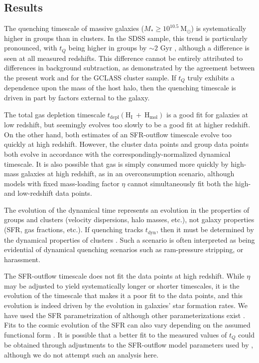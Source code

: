 \subsection{Results}

The quenching timescale of massive galaxies ($M_* \geq 10^{10.5}~ \mathrm{M}_\odot$) is systematically higher in groups than in clusters.
In the SDSS sample, this trend is particularly pronounced, with $t_Q$ being higher in groups by $\sim2$ Gyr \citep{Balogh:2016aa}, although a difference is seen at all measured redshifts.
This difference cannot be entirely attributed to differences in background subtraction, as demonstrated by the agreement between the present work and \citet{Balogh:2016aa} for the GCLASS cluster sample.
If $t_Q$ truly exhibits a dependence upon the mass of the host halo, then the quenching timescale is driven in part by factors external to the galaxy.

The total gas depletion timescale $t_{\mathrm{depl}}(\mathrm{H_I}~+~\mathrm{H_{mol}})$ is a good fit for galaxies at low redshift, but seemingly evolves too slowly to be a good fit at higher redshift.
On the other hand, both estimates of an SFR-outflow timescale evolve too quickly at high redshift.
However, the cluster data points and group data points both evolve in accordance with the correspondingly-normalized dynamical timescale.
It is also possible that gas is simply consumed more quickly by high-mass galaxies at high redshift, as in an overconsumption scenario, although models with fixed mass-loading factor $\eta$ cannot simultaneously fit both the high- and low-redshift data points.

The evolution of the dynamical time represents an evolution in the properties of groups and clusters (velocity dispersions, halo masses, etc.), not galaxy properties (SFR, gas fractions, etc.).
If quenching tracks $t_\mathrm{dyn}$, then it must be determined by the dynamical properties of clusters .
Such a scenario is often interpreted as being evidential of dynamical quenching scenarios such as ram-pressure stripping, or harassment.

The SFR-outflow timescale does not fit the data points at high redshift.
While $\eta$ may be adjusted to yield systematically longer or shorter timescales, it is the evolution of the timescale that makes it a poor fit to the data points, and this evolution is indeed driven by the evolution in galaxies' star formation rates.
We have used the SFR parametrization of \citet{Whitaker:2012aa} although other parameterizations exist \citep{Peng:2010aa}.
Fits to the cosmic evolution of the SFR can also vary depending on the assumed functional form \citep{Behroozi:2013aa}.
It is possible that a better fit to the measured values of $t_Q$ could be obtained through adjustments to the SFR-outflow model parameters used by \citet{McGee:2014aa}, although we do not attempt such an analysis here.

